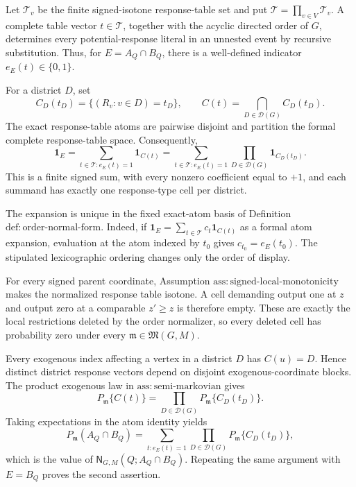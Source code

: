 Let \(\mathcal T_v\) be the finite signed-isotone response-table set and put \(\mathcal T=\prod_{v\in V}\mathcal T_v\).  A complete table vector \(t\in\mathcal T\), together with the acyclic directed order of \(G\), determines every potential-response literal in an unnested event by recursive substitution.  Thus, for \(E=A_Q\cap B_Q\), there is a well-defined indicator \(e_E(t)\in\{0,1\}\).

For a district \(D\), set
\[
 C_D(t_D)=\{(R_v:v\in D)=t_D\},
 \qquad
 C(t)=\bigcap_{D\in\mathcal D(G)}C_D(t_D).
\]
The exact response-table atoms are pairwise disjoint and partition the formal complete response-table space.  Consequently,
\[
 \mathbf 1_E
 =\sum_{t\in\mathcal T:e_E(t)=1}\mathbf 1_{C(t)}
 =\sum_{t\in\mathcal T:e_E(t)=1}
   \prod_{D\in\mathcal D(G)}\mathbf 1_{C_D(t_D)}.
\]
This is a finite signed sum, with every nonzero coefficient equal to \(+1\), and each summand has exactly one response-type cell per district.

The expansion is unique in the fixed exact-atom basis of Definition \(\mathrm{def:order\text{-}normal\text{-}form}\).  Indeed, if \(\mathbf 1_E=\sum_{t\in\mathcal T}c_t\mathbf 1_{C(t)}\) as a formal atom expansion, evaluation at the atom indexed by \(t_0\) gives \(c_{t_0}=e_E(t_0)\).  The stipulated lexicographic ordering changes only the order of display.

For every signed parent coordinate, Assumption \(\mathrm{ass:signed\text{-}local\text{-}monotonicity}\) makes the normalized response table isotone.  A cell demanding output one at \(z\) and output zero at a comparable \(z'\ge z\) is therefore empty.  These are exactly the local restrictions deleted by the order normalizer, so every deleted cell has probability zero under every \(\mathfrak m\in\mathfrak M(G,M)\).

Every exogenous index affecting a vertex in a district \(D\) has \(C(u)=D\).  Hence distinct district response vectors depend on disjoint exogenous-coordinate blocks.  The product exogenous law in \(\mathrm{ass:semi\text{-}markovian}\) gives
\[
 P_{\mathfrak m}\{C(t)\}
 =\prod_{D\in\mathcal D(G)}P_{\mathfrak m}\{C_D(t_D)\}.
\]
Taking expectations in the atom identity yields
\[
 P_{\mathfrak m}(A_Q\cap B_Q)
 =\sum_{t:e_E(t)=1}
   \prod_{D\in\mathcal D(G)}P_{\mathfrak m}\{C_D(t_D)\},
\]
which is the value of \(\mathsf N_{G,M}(Q;A_Q\cap B_Q)\).  Repeating the same argument with \(E=B_Q\) proves the second assertion.